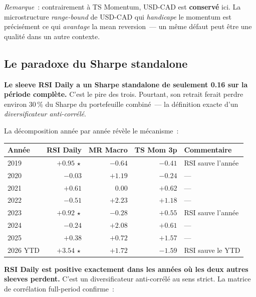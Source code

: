 \textit{Remarque}~: contrairement à TS Momentum, USD-CAD est \textbf{conservé} ici. La microstructure \emph{range-bound} de USD-CAD qui \emph{handicape} le momentum est précisément ce qui \emph{avantage} la mean reversion~--- un même défaut peut être une qualité dans un autre contexte.

\subsection{Le paradoxe du Sharpe standalone}

\begin{warningbox}
\textbf{Le sleeve RSI Daily a un Sharpe standalone de seulement 0.16 sur la période complète.} C'est le pire des trois. Pourtant, son retrait ferait perdre environ 30\,\% du Sharpe du portefeuille combiné~--- la définition exacte d'un \emph{diversificateur anti-corrélé}.
\end{warningbox}

La décomposition année par année révèle le mécanisme~:

\begin{center}
\renewcommand{\arraystretch}{1.1}
\begin{tabular}{lrrr p{4cm}}
\toprule
\textbf{Année} & \textbf{RSI Daily} & \textbf{MR Macro} & \textbf{TS Mom 3p} & \textbf{Commentaire} \\
\midrule
2019 & \textcolor{rsiGreen}{$+0.95\,\star$} & $-0.64$ & $-0.41$ & RSI sauve l'année \\
2020 & $-0.03$ & $+1.19$ & $-0.24$ & --- \\
2021 & $+0.61$ & $0.00$ & $+0.62$ & --- \\
2022 & $-0.51$ & \textcolor{rsiGreen}{$+2.23$} & $+1.18$ & --- \\
2023 & \textcolor{rsiGreen}{$+0.92\,\star$} & $-0.28$ & $+0.55$ & RSI sauve l'année \\
2024 & $-0.24$ & $+2.08$ & $+0.61$ & --- \\
2025 & $+0.38$ & $+0.72$ & $+1.57$ & --- \\
2026 YTD & \textcolor{rsiGreen}{$+3.54\,\star$} & $+1.72$ & $-1.59$ & RSI sauve le YTD \\
\bottomrule
\end{tabular}
\end{center}

\textbf{RSI Daily est positive exactement dans les années où les deux autres sleeves perdent.} C'est un diversificateur anti-corrélé au sens strict. La matrice de corrélation full-period confirme~:

